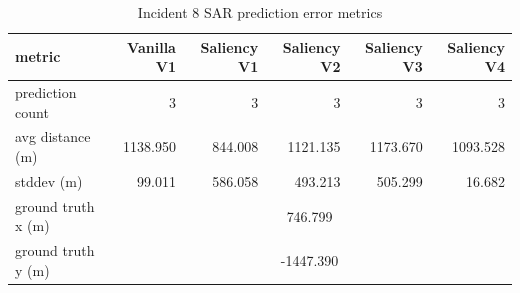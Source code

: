 \begin{table}[ht]
\centering
\caption{Incident 8 SAR prediction error metrics}
\label{tab:sar-incident-8}
\begin{tabular}{lrrrrr}
\hline
metric & Vanilla V1 & Saliency V1 & Saliency V2 & Saliency V3 & Saliency V4 \\
\hline
prediction count & 3 & 3 & 3 & 3 & 3 \\
avg distance (m) & 1138.950 & 844.008 & 1121.135 & 1173.670 & 1093.528 \\
stddev (m) & 99.011 & 586.058 & 493.213 & 505.299 & 16.682 \\
ground truth x (m) & \multicolumn{5}{c}{746.799} \\
ground truth y (m) & \multicolumn{5}{c}{-1447.390} \\
\hline
\end{tabular}
\end{table}
